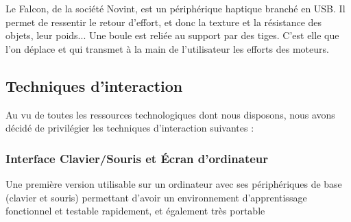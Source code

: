 Le Falcon, de la soci\'et\'e Novint, est un p\'eriph\'erique haptique branch\'e en USB. Il permet de ressentir le retour d'effort, et donc la texture et la r\'esistance des objets, leur poids... Une boule est reli\'ee au support par des tiges. C'est elle que l'on d\'eplace et qui transmet \`a la main de l'utilisateur les efforts des moteurs.
\\

\subsection{Techniques d'interaction}
Au vu de toutes les ressources technologiques dont nous disposons, nous avons d\'ecid\'e de privilégier les techniques d'interaction suivantes :

\subsubsection{Interface Clavier/Souris et \'Ecran d'ordinateur}
Une premi\`ere version utilisable sur un ordinateur avec ses p\'eriph\'eriques de base (clavier et souris) permettant d'avoir un environnement d'apprentissage fonctionnel et testable rapidement, et \'egalement tr\`es portable
\\
